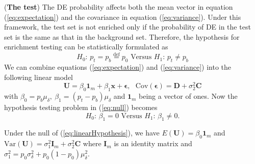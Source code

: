\documentclass[11pt, a4paper]{article}
\begin{document}
	(\textbf{The test}) The DE probability affects both the mean vector in equation (\ref{eq:expectation}) and the covariance in equation (\ref{eq:variance}). Under this framework, the test set is not enriched only if the probability of DE in the test set is the same as that in the background set. Therefore, the hypothesis for enrichment testing can be statistically formulated as
	\begin{equation}\label{eq:null}
		H_0\text{: }  p_t = p_b \stackrel{\text{def}}{=}p_0  \text{ Versus } H_1 \text{: } p_t \neq p_b
	\end{equation}
	We can combine equations (\ref{eq:expectation}) and (\ref{eq:variance}) into the following linear model
	\begin{equation}\label{eq:linearModel}
		\bm U = \beta_0\bm 1_m + \beta_1\bm x + \bm \epsilon, \text{~~Cov}(\bm \epsilon) =  \bm D  + \sigma_2^2\bm C
	\end{equation} 
	with $ \beta_0 = p_b\mu_{\delta}, ~\beta_1 = (p_t-p_b)\mu_{\delta}$ and $\bm 1_m$ being a vector of ones. Now the hypothesis testing problem in (\ref{eq:null}) becomes 
	\begin{equation}\label{eq:linearHypothesis}
		H_0\text{: }  \beta_1 = 0   \text{ Versus } H_1 \text{: } \beta_1 \neq 0.
	\end{equation}

	
	
	Under the null of (\ref{eq:linearHypothesis}), we have $E(\bm U) = \beta_0\bm 1_m$ and $\text{Var}(\bm U) = \sigma^2_1\bm I_m + \sigma_2^2 \bm C$ where $\bm I_m$ is an identity matrix and $\sigma_1^2 = p_0\sigma^2_{\delta}+ p_0(1-p_0)\mu^2_{\delta}$.
	
\end{document}
